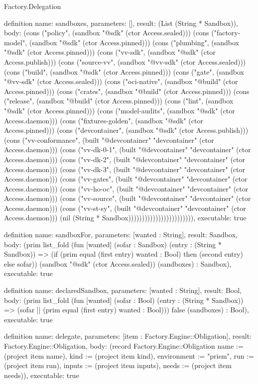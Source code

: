 \begin{lexlean}{Factory.Delegation}
\begin{semanticmodule}
definition{
  name: sandboxes,
  parameters: [],
  result: (List (String * Sandbox)),
  body: (cons ("policy", (sandbox "@sdk" (ctor Access.sealed))) (cons ("factory-model", (sandbox "@sdk" (ctor Access.pinned))) (cons ("plumbing", (sandbox "@sdk" (ctor Access.pinned))) (cons ("vv-sdk", (sandbox "@sdk" (ctor Access.publish))) (cons ("source-vv", (sandbox "@vv-sdk" (ctor Access.sealed))) (cons ("build", (sandbox "@sdk" (ctor Access.pinned))) (cons ("gate", (sandbox "@vv-sdk" (ctor Access.sealed))) (cons ("oci-native", (sandbox "@build" (ctor Access.pinned))) (cons ("crates", (sandbox "@build" (ctor Access.pinned))) (cons ("release", (sandbox "@build" (ctor Access.pinned))) (cons ("lint", (sandbox "@sdk" (ctor Access.pinned))) (cons ("model-audits", (sandbox "@sdk" (ctor Access.daemon))) (cons ("fixtures-golden", (sandbox "@sdk" (ctor Access.pinned))) (cons ("devcontainer", (sandbox "@sdk" (ctor Access.publish))) (cons ("vv-conformance", (built "@devcontainer" "devcontainer" (ctor Access.daemon))) (cons ("vv-dk-0-1", (built "@devcontainer" "devcontainer" (ctor Access.daemon))) (cons ("vv-dk-2", (built "@devcontainer" "devcontainer" (ctor Access.daemon))) (cons ("vv-dk-3", (built "@devcontainer" "devcontainer" (ctor Access.daemon))) (cons ("vv-gates", (built "@devcontainer" "devcontainer" (ctor Access.daemon))) (cons ("vv-ho-oc", (built "@devcontainer" "devcontainer" (ctor Access.daemon))) (cons ("vv-source", (built "@devcontainer" "devcontainer" (ctor Access.daemon))) (cons ("vv-st-sy", (built "@devcontainer" "devcontainer" (ctor Access.daemon))) (nil (String * Sandbox)))))))))))))))))))))))),
  executable: true
}

definition{
  name: sandboxFor,
  parameters: [wanted : String],
  result: Sandbox,
  body: (prim list_fold (fun [wanted] (sofar : Sandbox) (entry : (String * Sandbox)) => (if (prim equal (first entry) wanted : Bool) then (second entry) else sofar)) (sandbox "@sdk" (ctor Access.sealed)) (sandboxes) : Sandbox),
  executable: true
}

definition{
  name: declaredSandbox,
  parameters: [wanted : String],
  result: Bool,
  body: (prim list_fold (fun [wanted] (sofar : Bool) (entry : (String * Sandbox)) => (sofar || (prim equal (first entry) wanted : Bool))) false (sandboxes) : Bool),
  executable: true
}

definition{
  name: delegate,
  parameters: [item : Factory.Engine::Obligation],
  result: Factory.Engine::Obligation,
  body: (record Factory.Engine::Obligation {name := (project item name), kind := (project item kind), environment := "prism", run := (project item run), inputs := (project item inputs), needs := (project item needs)}),
  executable: true
}


\end{semanticmodule}
\end{lexlean}
